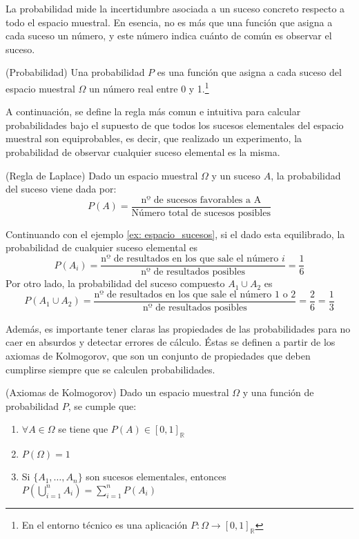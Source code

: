 La probabilidad mide la incertidumbre asociada a un suceso concreto respecto a todo el espacio muestral. En esencia, no es más que una función que asigna a cada suceso un número, y este número indica cuánto de común es observar el suceso.
\begin{definition}(Probabilidad)
Una probabilidad $P$ es una función que asigna a cada suceso del espacio muestral $\Omega$ un número real entre 0 y 1.\footnote{ En el entorno técnico es una aplicación $P: \Omega \longrightarrow [0, 1]_{\mathbb{R}}$}
\end{definition}
A continuación, se define la regla más comun e intuitiva para calcular probabilidades bajo el supuesto de que todos los sucesos elementales del espacio muestral son equiprobables, es decir, que realizado un experimento, la probabilidad de observar cualquier suceso elemental es la misma.
\begin{definition}(Regla de Laplace)
Dado un espacio muestral $\Omega$ y un suceso $A$, la probabilidad del suceso viene dada por:
$$P(A) = \frac{\textrm{nº de sucesos favorables a A}}{\textrm{Número total de sucesos posibles}}$$	
\end{definition}
\begin{example}
Continuando con el ejemplo \ref{ex: espacio_sucesos}, si el dado esta equilibrado, la probabilidad de cualquier suceso elemental es
$$P(A_i) = \frac{\textrm{nº de resultados en los que sale el número } i}{\textrm{nº de resultados posibles}} = \frac{1}{6}$$
Por otro lado, la probabilidad del suceso compuesto $A_1 \cup A_2$ es
$$P(A_1 \cup A_2) = \frac{\textrm{nº de resultados en los que sale el número } 1 \textrm{ o } 2}{\textrm{nº de resultados posibles}} = \frac{2}{6}=\frac{1}{3}$$	
	\label{ex: probabilidad calculo}
\end{example}
Además, es importante tener claras las propiedades de las probabilidades para no caer en absurdos y detectar errores de cálculo. Éstas se definen a partir de los axiomas de Kolmogorov, que son un conjunto de propiedades que deben cumplirse siempre que se calculen probabilidades.
\begin{definition}(Axiomas de Kolmogorov)
Dado un espacio muestral $\Omega$ y una función de probabilidad $P$, se cumple que:
\begin{enumerate}
	\item $\forall A \in \Omega$ se tiene que $P(A) \in [0, 1]_{\mathbb{R}}$
	\item $P(\Omega) = 1$
	\item Si $\lbrace A_1,\ldots,A_n \rbrace$ son sucesos elementales, entonces $P(\bigcup_{i=1}^n{A_i}) = \sum_{i=1}^n{P(A_i)}$
\end{enumerate}
\end{definition}
